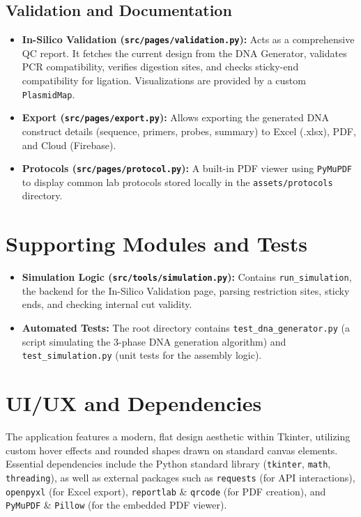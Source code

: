 \documentclass[12pt]{article}
\begin{document}
\subsection{Validation and Documentation}
\begin{itemize}
    \item \textbf{In-Silico Validation (\texttt{src/pages/validation.py}):} Acts as a comprehensive QC report. It fetches the current design from the DNA Generator, validates PCR compatibility, verifies digestion sites, and checks sticky-end compatibility for ligation. Visualizations are provided by a custom \texttt{PlasmidMap}.
    \item \textbf{Export (\texttt{src/pages/export.py}):} Allows exporting the generated DNA construct details (sequence, primers, probes, summary) to Excel (.xlsx), PDF, and Cloud (Firebase).
    \item \textbf{Protocols (\texttt{src/pages/protocol.py}):} A built-in PDF viewer using \texttt{PyMuPDF} to display common lab protocols stored locally in the \texttt{assets/protocols} directory.
\end{itemize}

\section{Supporting Modules and Tests}
\begin{itemize}
    \item \textbf{Simulation Logic (\texttt{src/tools/simulation.py}):} Contains \texttt{run\_simulation}, the backend for the In-Silico Validation page, parsing restriction sites, sticky ends, and checking internal cut validity.
    \item \textbf{Automated Tests:} The root directory contains \texttt{test\_dna\_generator.py} (a script simulating the 3-phase DNA generation algorithm) and \texttt{test\_simulation.py} (unit tests for the assembly logic).
\end{itemize}

\section{UI/UX and Dependencies}
The application features a modern, flat design aesthetic within Tkinter, utilizing custom hover effects and rounded shapes drawn on standard canvas elements. Essential dependencies include the Python standard library (\texttt{tkinter}, \texttt{math}, \texttt{threading}), as well as external packages such as \texttt{requests} (for API interactions), \texttt{openpyxl} (for Excel export), \texttt{reportlab} \& \texttt{qrcode} (for PDF creation), and \texttt{PyMuPDF} \& \texttt{Pillow} (for the embedded PDF viewer).
\end{document}

